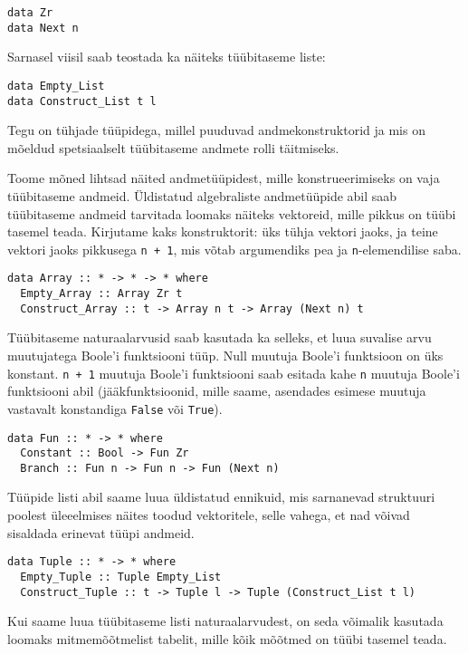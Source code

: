\documentclass[12pt]{article}
\begin{document}
      \begin{verbatim}data Zr
data Next n\end{verbatim}

      Sarnasel viisil saab teostada ka näiteks tüübitaseme liste:

      \begin{verbatim}data Empty_List
data Construct_List t l\end{verbatim}

      Tegu on tühjade tüüpidega, millel puuduvad andmekonstruktorid ja mis on mõeldud spetsiaalselt tüübitaseme andmete rolli täitmiseks.

      Toome mõned lihtsad näited andmetüüpidest, mille konstrueerimiseks on vaja tüübitaseme andmeid. Üldistatud algebraliste andmetüüpide abil saab tüübitaseme andmeid tarvitada loomaks näiteks vektoreid, mille pikkus on tüübi tasemel teada. Kirjutame kaks konstruktorit: üks tühja vektori jaoks, ja teine vektori jaoks pikkusega \verb!n + 1!, mis võtab argumendiks pea ja \verb!n!-elemendilise saba.

      \begin{verbatim}data Array :: * -> * -> * where
  Empty_Array :: Array Zr t
  Construct_Array :: t -> Array n t -> Array (Next n) t\end{verbatim}

      Tüübitaseme naturaalarvusid saab kasutada ka selleks, et luua suvalise arvu muutujatega Boole'i funktsiooni tüüp. Null muutuja Boole'i funktsioon on üks konstant. \verb!n + 1! muutuja Boole'i funktsiooni saab esitada kahe \verb!n! muutuja Boole'i funktsiooni abil (jääkfunktsioonid, mille saame, asendades esimese muutuja vastavalt konstandiga \verb!False! või \verb!True!).

      \begin{verbatim}data Fun :: * -> * where
  Constant :: Bool -> Fun Zr
  Branch :: Fun n -> Fun n -> Fun (Next n)\end{verbatim}

      Tüüpide listi abil saame luua üldistatud ennikuid, mis sarnanevad struktuuri poolest üleeelmises näites toodud vektoritele, selle vahega, et nad võivad sisaldada erinevat tüüpi andmeid.

      \begin{verbatim}data Tuple :: * -> * where
  Empty_Tuple :: Tuple Empty_List
  Construct_Tuple :: t -> Tuple l -> Tuple (Construct_List t l)\end{verbatim}

      Kui saame luua tüübitaseme listi naturaalarvudest, on seda võimalik kasutada loomaks mitmemõõtmelist tabelit, mille kõik mõõtmed on tüübi tasemel teada.
\end{document}

